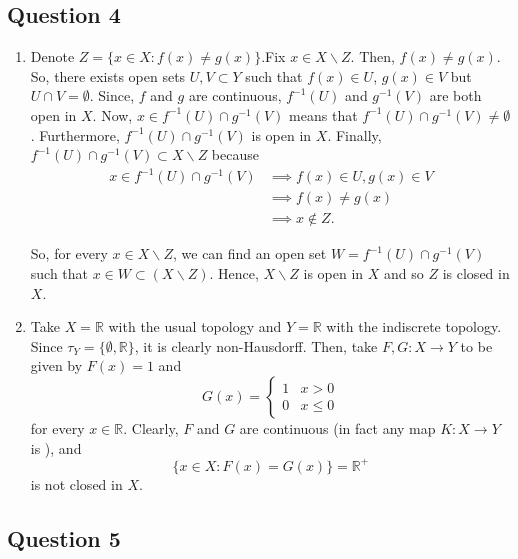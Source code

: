 \documentclass{article}
\newcommand{\R}{\mathbb{R}}
\begin{document}
\subsection*{Question 4}

\begin{enumerate}[label=\roman*)]

\item Denote $Z=\{x \in X: f(x) \neq g(x) \}. $Fix $x\in X \backslash Z$. Then, $f(x) \neq g(x)$. 
So, there exists open sets $U,V \subset Y$ such that $f(x) \in U$, $g(x) \in V$ but $U \cap V = 
\emptyset$. Since, $f$ and $g$ are continuous, $f^{-1}(U)$ and $g^{-1}(V)$ are both open in $X$. 
Now, $x \in f^{-1}(U) \cap g^{-1}(V)$ means that $f^{-1}(U) \cap g^{-1}(V) \neq \emptyset$. 
Furthermore, $f^{-1}(U) \cap g^{-1}(V)$ is open in $X$. Finally, $f^{-1}(U) \cap g^{-1}(V) 
\subset X \backslash Z$ because 
\begin{align*}
    x\in f^{-1}(U) \cap g^{-1}(V) &\implies 
f(x) \in U , g(x) \in V \\&\implies f(x) \neq g(x)\\& \implies x\notin Z.
\end{align*}

So, for every $x \in  X \backslash Z$, we can find an open set $W=f^{-1}(U) \cap g^{-1}(V)$ such that $x\in W \subset (X \backslash Z)$. Hence, $X \backslash Z$ is open in $X$ and so $Z$ is closed in $X$. 

\item Take $X=\R$ with the usual topology and $Y=\R$ with the indiscrete topology. 
Since $\tau_Y=\{\emptyset,\R\}$, it is clearly non-Hausdorff. Then, take 
$F,G: X\to Y$ to be given by $F(x)=1$ and 
$$
G(x) = \begin{cases}
    1 &x>0\\
    0 &x\leq 0
\end{cases}
$$ for every $x\in\R$. Clearly, $F$ and $G$ are continuous (in fact any map $K:X\to Y$ is ), and 
$$\{x\in X: F(x)=G(x)\} = \R^+$$ is not closed in $X$.

\end{enumerate}
\newpage
\subsection*{Question 5}
\end{document}
